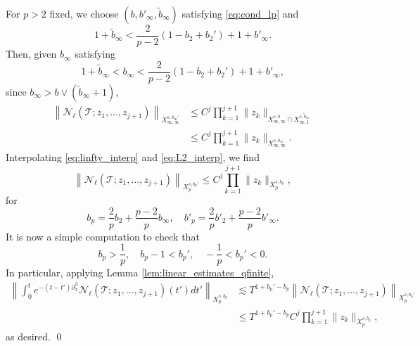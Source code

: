 \documentclass[%
11pt,  reqno]{amsart}
\newcommand{\5}{\textup{V}}
\newcommand{\dx}{\partial_x}
\theoremstyle{remark}
\newcommand{\TT}{\mathcal{T}}
\renewcommand{\l}{\ell}
\numberwithin{equation}{section}
\numberwithin{theorem}{section}
\newcommand{\Ncal}{\mathcal{N}}
\begin{document}
For $p>2$ fixed, we choose $(b, b'_\infty, \tilde{b}_\infty)$ satisfying \eqref{eq:cond_lp} and
\begin{equation}
    1+\tilde{b}_\infty <\frac{2}{p-2}(1-b_2+b_2') + 1 + b'_\infty.
\end{equation}
Then, given $b_\infty$ satisfying
\begin{equation}
    1+\tilde{b}_\infty<b_\infty <\frac{2}{p-2}(1-b_2+b_2') + 1 + b'_\infty,
\end{equation}
since $b_\infty>b\lor(\tilde{b}_\infty+1)$,
\begin{align}
    \left\| \Ncal_\l(\TT; z_1,\dots, z_{j+1})\right\|_{X^{s,b_\infty'}_{\infty, \infty}} &\le  C^j\prod_{k=1}^{j+1}\|z_k\|_{X^{s,b}_{\infty, \infty}\cap X^{s,\tilde{b}_\infty}_{\infty,1}}\\&\le  C^j\prod_{k=1}^{j+1}\|z_k\|_{X^{s,b_\infty}_{\infty, \infty}}.\label{eq:linfty_interp}
\end{align}
Interpolating \eqref{eq:linfty_interp} and \eqref{eq:L2_interp}, we find
\begin{equation}\label{eq:Lp_interp}
		\left\| \Ncal_\l(\TT; z_1,\dots, z_{j+1})\right\|_{X^{s,b_p'}_{p}}  \le  C^j\prod_{k=1}^{j+1}\|z_k\|_{X^{s,b_p}_{p}},
\end{equation}
for
$$
b_p=\frac{2}{p}b_2+\frac{p-2}{p}b_\infty,\quad b'_p=\frac{2}{p}b'_2+\frac{p-2}{p}b'_\infty.
$$
It is now a simple computation to check that
$$
b_p>\frac1p,\quad b_p-1<b_p',\quad -\frac{1}{p}<b_p'<0.
$$
In particular, applying Lemma \ref{lem:linear_estimates_qfinite},
	\begin{align}\label{eq:bourg_bi_lp}
		\left\|\int_0^t e^{-(t-t')\dx^3} \Ncal_\l(\TT; z_1,\dots, z_{j+1})(t') dt'  \right\|_{X^{s,b_p}_{p}} 
        &	\lesssim T^{1+b_p'-b_p}\left\|\Ncal_\l(\TT; z_1,\dots, z_{j+1})  \right\|_{X^{s,b_p'}_{p}} 
        \\&\le T^{1+b_p'-b_p} C^j\prod_{k=1}^{j+1}\|z_k\|_{X^{s,b_p}_{p}},
	\end{align}
as desired. \qed



\end{document}
